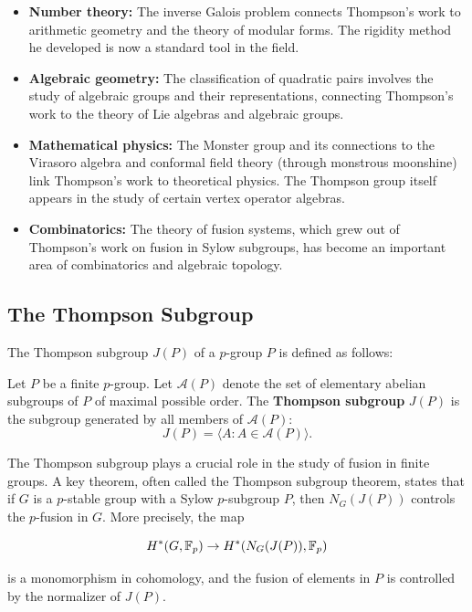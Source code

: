 \begin{itemize}
\item \textbf{Number theory:} The inverse Galois problem connects Thompson's work to arithmetic geometry and the theory of modular forms. The rigidity method he developed is now a standard tool in the field.

\item \textbf{Algebraic geometry:} The classification of quadratic pairs involves the study of algebraic groups and their representations, connecting Thompson's work to the theory of Lie algebras and algebraic groups.

\item \textbf{Mathematical physics:} The Monster group and its connections to the Virasoro algebra and conformal field theory (through monstrous moonshine) link Thompson's work to theoretical physics. The Thompson group itself appears in the study of certain vertex operator algebras.

\item \textbf{Combinatorics:} The theory of fusion systems, which grew out of Thompson's work on fusion in Sylow subgroups, has become an important area of combinatorics and algebraic topology.
\end{itemize}

\subsection{The Thompson Subgroup}

The Thompson subgroup \(J(P)\) of a \(p\)-group \(P\) is defined as follows:

\begin{definition}
Let \(P\) be a finite \(p\)-group. Let \(\mathscr{A}(P)\) denote the set of elementary abelian subgroups of \(P\) of maximal possible order. The \textbf{Thompson subgroup} \(J(P)\) is the subgroup generated by all members of \(\mathscr{A}(P)\):
\[
J(P) = \langle A : A \in \mathscr{A}(P) \rangle.
\]
\end{definition}

The Thompson subgroup plays a crucial role in the study of fusion in finite groups. A key theorem, often called the Thompson subgroup theorem, states that if \(G\) is a \(p\)-stable group with a Sylow \(p\)-subgroup \(P\), then \(N_G(J(P))\) controls the \(p\)-fusion in \(G\). More precisely, the map

\[
H^*(G, \mathbb{F}_p) \to H^*(N_G(J(P)), \mathbb{F}_p)
\]

is a monomorphism in cohomology, and the fusion of elements in \(P\) is controlled by the normalizer of \(J(P)\).

